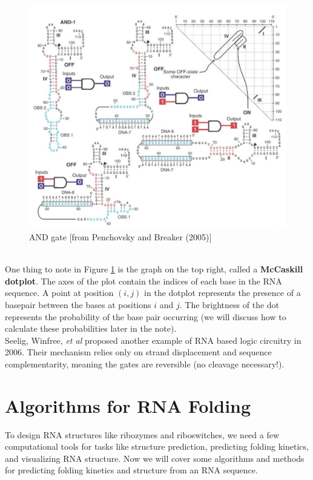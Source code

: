 \documentclass[12pt]{article}
\begin{document}
\begin{figure}[ht]
    \centering
    \includegraphics[width =.8\linewidth]{andgate.png}
    \caption{AND gate [from Penchovsky and Breaker (2005)]}
    \label{fig:and_gate}
\end{figure}\\
One thing to note in Figure \ref{fig:and_gate} is the graph on the top right, called a {\bf McCaskill dotplot}. The axes of the plot contain the indices of each base in the RNA sequence. A point at position $(i, j)$ in the dotplot represents the presence of a basepair between the bases at positions $i$ and $j$. The brightness of the dot represents the probability of the base pair occurring (we will discuss how to calculate these probabilities later in the note).\\[10pt]
Seelig, Winfree, {\it et al} proposed another example of RNA based logic circuitry in 2006. Their mechanism relies only on strand displacement and sequence complementarity, meaning the gates are reversible (no cleavage necessary!). 
\section{Algorithms for RNA Folding}
To design RNA structures like ribozymes and riboswitches, we need a few computational tools for tasks like structure prediction, predicting folding kinetics, and visualizing RNA structure. Now we will cover some algorithms and methods for predicting folding kinetics and structure from an RNA sequence.
\end{document}
